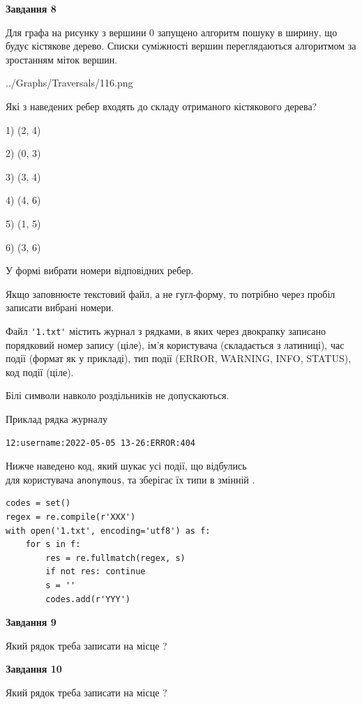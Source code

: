 \documentclass[12pt, ukrainian]{article}
\def\code#1{\Verb!#1!}
\begin{document}
{\begin {large}
{\begin {center}\textbf{Завдання 8}\end {center}}\par
Для графа на рисунку з вершини 0 запущено алгоритм пошуку в ширину, що будує кістякове дерево. Списки суміжності вершин переглядаються алгоритмом за зростанням міток вершин.\par
\begin{center}
	{../Graphs/Traversals/116.png}
\end{center}
\par Які з наведених ребер входять до складу отриманого кістякового дерева?\par
1) (2, 4)\par
2) (0, 3)\par
3) (3, 4)\par
4) (4, 6)\par
5) (1, 5)\par
6) (3, 6)\par
{\vskip 15pt} У формі вибрати номери відповідних ребер.


Якщо заповнюєте текстовий файл, а не гугл-форму, то потрібно через пробіл записа\-ти вибрані номери.\par
\newpage


Файл \code{'1.txt'} містить журнал з рядками, в яких через двокрапку записано поряд\-ко\-вий номер запису (ціле), ім'я користувача (складається з латиниці), час події (фор\-мат як у прикладі), тип події (ERROR, WARNING, INFO, STATUS), код події (ціле).

Білі символи навколо роздільників не допускаються.

Приклад рядка журналу



\begin{verbatim}
12:username:2022-05-05 13-26:ERROR:404
\end{verbatim}


Нижче наведено код, який шукає усі події, що відбулись\\ для користувача \code{anonymous}, та зберігає їх типи в змінній .



\begin{verbatim}
codes = set()
regex = re.compile(r'XXX')
with open('1.txt', encoding='utf8') as f:
    for s in f:
        res = re.fullmatch(regex, s)
        if not res: continue
        s = ''
        codes.add(r'YYY')
\end{verbatim}


{\begin {center}\textbf{Завдання 9}\end {center}}\par
Який рядок треба записати на місце  ?\par
\vspace{5mm}


{\begin {center}\textbf{Завдання 10}\end {center}}\par
Який рядок треба записати на місце  ?\par


\newpage


\end {large}}
\end{document}
